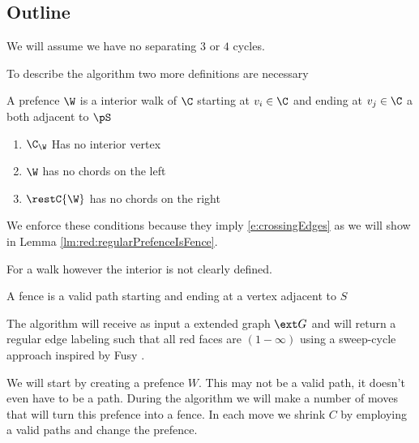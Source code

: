
\subsection{Outline}
  We will assume we have no separating $3$ or $4$ cycles.

  To describe the algorithm two more definitions are necessary

  \begin{defi}[Prefence]
  A prefence $\W$ is a interior walk of $\C$ starting at $v_i \in \C$ and ending at $v_j \in \C$ a both adjacent to $\pS$
  \begin{enumerate}
   \renewcommand*{\labelenumi}{(P\arabic{enumi})}%
   \renewcommand*{\theenumi}{(P\arabic{enumi})}%
    \item  $\C_\W$ Has no interior vertex
    \label{p:noInteriorVertex}
    \item  $\W$ has no chords on the left
    \label{p:Cchordfree}
    \item  $\restC{\W}$ has no chords on the right
    \label{p:Wchordfree}

  \end{enumerate}
  \end{defi}


  We enforce these conditions because they imply \ref{e:crossingEdges} as we will show in Lemma \ref{lm:red:regularPrefenceIsFence}.

  For a walk however the interior is not clearly defined. 

  \begin{defi}[Fence]
    A fence is a valid path starting and ending at a vertex adjacent to $S$
  \end{defi}




  The algorithm will receive as input a extended graph $\ext G$ and will return a regular edge labeling such that all red faces are $(1-\infty)$ using a sweep-cycle approach inspired by Fusy \cite{Fusy2006}.

  We will start by creating a prefence $W$. This may not be a valid path, it doesn't even have to be a path. During the algorithm we will make a number of moves that will turn this prefence into a fence. In each move we shrink $C$ by employing a valid paths and change the prefence.

